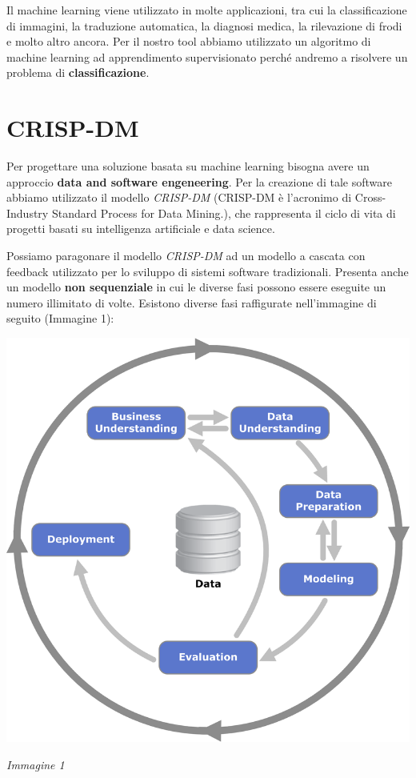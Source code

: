 \documentclass[12pt]{article}
\begin{document}
Il machine learning viene utilizzato in molte applicazioni, tra cui la classificazione di immagini, la traduzione automatica, la diagnosi medica, la rilevazione di frodi e molto altro ancora.
Per il nostro tool abbiamo utilizzato un algoritmo di machine learning ad apprendimento supervisionato perché andremo a risolvere un problema di \textbf{classificazione}.

\section{CRISP-DM}
Per progettare una soluzione basata su machine learning bisogna avere un approccio \textbf{data and software engeneering}.
Per la creazione di tale software abbiamo utilizzato il modello \textit{CRISP-DM} (CRISP-DM è l’acronimo di Cross-Industry Standard Process for Data Mining.),
che rappresenta il ciclo di vita di progetti basati su intelligenza artificiale e data science.

Possiamo paragonare il modello \textit{CRISP-DM} ad un modello a cascata con feedback utilizzato per lo sviluppo di sistemi software
tradizionali. Presenta anche un modello \textbf{non sequenziale} in cui le diverse fasi possono essere eseguite un numero illimitato
di volte. Esistono diverse fasi raffigurate nell'immagine di seguito (Immagine 1):

\begin{center}
    \includegraphics[scale=2.1]{CRISP-DM.png}

    \textit{Immagine 1}
\end{center}
\end{document}
